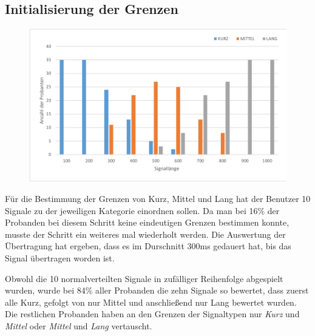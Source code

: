 \subsection{Initialisierung der Grenzen}
\label{ch:Evolution{\"a}rer Algorithmus:sec:Studiendesign}

\begin{figure}[htbp] 
            \centering
   	\includegraphics[width=\textwidth]{pics/analyse/Initialisierung.png}
	\caption{}
	\label{fig:Initialisierung}
\end{figure}

F{\"u}r die Bestimmung der Grenzen von Kurz, Mittel und Lang hat der Benutzer 10 Signale zu der jeweiligen Kategorie einordnen sollen. 
Da man bei 16\% der Probanden bei diesem Schritt keine eindeutigen Grenzen bestimmen konnte, musste der Schritt ein weiteres mal wiederholt werden. Die Auswertung der Übertragung hat ergeben, dass es im Durschnitt 300ms gedauert hat, bis das Signal übertragen worden ist.

Obwohl die 10 normalverteilten Signale in zuf{\"a}lliger Reihenfolge abgespielt wurden, wurde bei 84\% aller Probanden die zehn Signale so bewertet, dass zuerst alle Kurz, gefolgt von nur Mittel und anschlie{\ss}end nur Lang bewertet wurden. 
Die restlichen Probanden haben an den Grenzen der Signaltypen nur \textit{Kurz} und \textit{Mittel} oder \textit{Mittel} und \textit{Lang} vertauscht.


